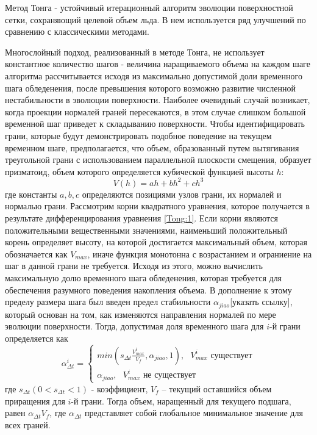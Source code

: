 Метод Тонга - устойчивый итерационный алгоритм эволюции поверхностной сетки, сохраняющий целевой объем льда.
В нем используется ряд улучшений по сравнению с классическими методами.

Многослойный подход, реализованный в методе Тонга, не использует константное количество шагов - величина наращиваемого объема на каждом шаге алгоритма рассчитывается исходя из максимально допустимой доли временного шага обледенения, после превышения которого возможно развитие численной нестабильности в эволюции поверхности. Наиболее очевидный случай возникает, когда проекции нормалей граней пересекаются, в этом случае слишком большой временной шаг приведет к складыванию поверхности. Чтобы идентифицировать грани, которые будут демонстрировать подобное поведение на текущем временном шаге, предполагается, что объем, образованный путем вытягивания треугольной грани с использованием параллельной плоскости смещения, образует призматоид, объем которого определяется кубической функцией высоты $h$:
\begin{equation} \label{Tong:1}
V(h)=ah+bh^2+ch^3
\end{equation}
где константы $a,b,c$ определяются позициями узлов грани, их нормалей и нормалью грани. Рассмотрим корни квадратного уравнения, которое получается в результате дифференцирования уравнения \ref{Tong:1}. Если корни являются положительными вещественными значениями, наименьший положительный корень определяет высоту, на которой достигается максимальный объем, которая обозначается как $V_{max}$, иначе функция монотонна с возрастанием и ограниение на шаг в данной грани не требуется. Исходя из этого, можно вычислить максимальную долю временного шага обледенения, которая требуется для обеспечения разумного поведения накопления объема. В дополнение к этому пределу размера шага был введен предел стабильности $\alpha_{jiao}$[указать ссылку], который основан на том, как изменяются направления нормалей по мере эволюции поверхности.  Тогда, допустимая доля временного шага для $i$-й грани определяется как
\begin{equation} \label{Tong:2}
\alpha_{\Delta t}^i=\begin{cases}
min(s_{\Delta t}\frac{V_{max}^i}{V_f},\alpha_{jiao},1), \text{ $V_{max}^i$ существует}\\
\alpha_{jiao}, \text{ $V_{max}^i$ не существует}
\end{cases}
\end{equation}
где $s_{\Delta t} (0<s_{\Delta t}<1)$ - коэффициент, $V_f$ – текущий оставшийся объем приращения для $i$-й грани. Тогда объем, наращенный для текущего подшага, равен $\alpha_{\Delta t}V_f$, где $\alpha_{\Delta t}$ представляет собой глобальное минимальное значение для всех граней.


